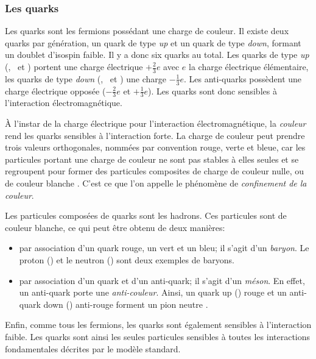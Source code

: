 \subsubsection{Les quarks}\label{chapter-MS-MSSM-section-SM_ptcs-subsec-fermions-subsubsec-quarks}
Les quarks sont les fermions possédant une charge de couleur.
Il existe deux quarks par génération, un quark de type \emph{up} et un quark de type \emph{down}, formant un doublet d'isospin faible. Il y a donc six quarks au total. Les quarks de type \emph{up} (\quarku, \quarkc\ et \quarkt) portent une charge électrique $+\frac{2}{3}e$ avec $e$ la charge électrique élémentaire, les quarks de type \emph{down} (\quarkd, \quarks\ et \quarkb) une charge $-\frac{1}{3}e$. Les anti-quarks possèdent une charge électrique opposée ($-\frac{2}{3}e$ et $+\frac{1}{3}e$). Les quarks sont donc sensibles à l'interaction électromagnétique.
\par À l'instar de la charge électrique pour l'interaction électromagnétique, la \emph{couleur} rend les quarks sensibles à l'interaction forte. La charge de couleur peut prendre trois valeurs orthogonales, nommées par convention rouge, verte et bleue, car les particules portant une charge de couleur ne sont pas stables à elles seules et se regroupent pour former des particules composites de charge de couleur nulle, ou de couleur \og blanche \fg{}. C'est ce que l'on appelle le phénomène de \emph{confinement de la couleur}.
\par Les particules composées de quarks sont les hadrons. Ces particules sont de couleur blanche, ce qui peut être obtenu de deux manières:
\begin{itemize}
\item par association d'un quark rouge, un vert et un bleu; il s'agit d'un \emph{baryon}. Le proton (\quarku\quarku\quarkd) et le neutron (\quarku\quarkd\quarkd) sont deux exemples de baryons.
\item par association d'un quark et d'un anti-quark; il s'agit d'un \emph{méson}. En effet, un anti-quark porte une \emph{anti-couleur}. Ainsi, un quark up (\quarku) rouge et un anti-quark down (\antiquarkd) \og anti-rouge \fg{} forment un pion neutre \pionnull.
\end{itemize}
\par Enfin, comme tous les fermions, les quarks sont également sensibles à l'interaction faible. Les quarks sont ainsi les seules particules sensibles à toutes les interactions fondamentales décrites par le modèle standard.

